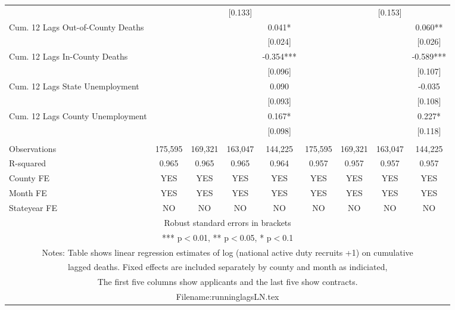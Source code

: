 \documentclass[]{article}
\begin{document}
\begin{tabular}{lcccccccc}
 &  &  & [0.133] &  &  &  & [0.153] &  \\
Cum. 12 Lags Out-of-County Deaths &  &  &  & 0.041* &  &  &  & 0.060** \\
 &  &  &  & [0.024] &  &  &  & [0.026] \\
Cum. 12 Lags In-County Deaths &  &  &  & -0.354*** &  &  &  & -0.589*** \\
 &  &  &  & [0.096] &  &  &  & [0.107] \\
Cum. 12 Lags State Unemployment &  &  &  & 0.090 &  &  &  & -0.035 \\
 &  &  &  & [0.093] &  &  &  & [0.108] \\
Cum. 12 Lags County Unemployment &  &  &  & 0.167* &  &  &  & 0.227* \\
 &  &  &  & [0.098] &  &  &  & [0.118] \\
 &  &  &  &  &  &  &  &  \\
Observations & 175,595 & 169,321 & 163,047 & 144,225 & 175,595 & 169,321 & 163,047 & 144,225 \\
R-squared & 0.965 & 0.965 & 0.965 & 0.964 & 0.957 & 0.957 & 0.957 & 0.957 \\
County FE & YES & YES & YES & YES & YES & YES & YES & YES \\
Month FE & YES & YES & YES & YES & YES & YES & YES & YES \\
 Stateyear FE & NO & NO & NO & NO & NO & NO & NO & NO \\ \hline
\multicolumn{9}{c}{ Robust standard errors in brackets} \\
\multicolumn{9}{c}{ *** p$<$0.01, ** p$<$0.05, * p$<$0.1} \\
\multicolumn{9}{c}{ Notes: Table shows linear regression estimates of log (national active duty recruits +1) on cumulative} \\
\multicolumn{9}{c}{ lagged deaths. Fixed effects are included separately by county and month as indiciated,} \\
\multicolumn{9}{c}{ The first five columns show applicants and the last five show contracts.} \\
\multicolumn{9}{c}{ Filename:runninglagsLN.tex} \\
\end{tabular}
\end{document}

